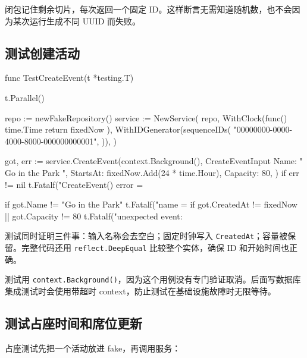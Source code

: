闭包记住剩余切片，每次返回一个固定 ID。这样断言无需知道随机数，也不会因为某次运行生成不同 UUID 而失败。

\subsection{测试创建活动}

\begin{gocode}[title={代码清单 12.22 \texttt{service\_test.go}：创建活动测试}]
func TestCreateEvent(t *testing.T) {
    t.Parallel()

    repo := newFakeRepository()
    service := NewService(
        repo,
        WithClock(func() time.Time { return fixedNow }),
        WithIDGenerator(sequenceIDs(
            "00000000-0000-4000-8000-000000000001",
        )),
    )

    got, err := service.CreateEvent(context.Background(),
        CreateEventInput{
            Name: "  Go in the Park  ",
            StartsAt: fixedNow.Add(24 * time.Hour),
            Capacity: 80,
        })
    if err != nil {
        t.Fatalf("CreateEvent() error = %
    }

    if got.Name != "Go in the Park" {
        t.Fatalf("name = %
    }
    if got.CreatedAt != fixedNow || got.Capacity != 80 {
        t.Fatalf("unexpected event: %
    }
}
\end{gocode}

测试同时证明三件事：输入名称会去空白；固定时钟写入 \texttt{CreatedAt}；容量被保留。完整代码还用 \texttt{reflect.DeepEqual} 比较整个实体，确保 ID 和开始时间也正确。

测试用 \texttt{context.Background()}，因为这个用例没有专门验证取消。后面写数据库集成测试时会使用带超时 context，防止测试在基础设施故障时无限等待。

\subsection{测试占座时间和席位更新}

占座测试先把一个活动放进 fake，再调用服务：

